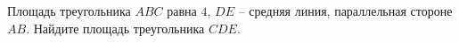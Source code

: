 \begin{ex}
	\begin{condition}
		Площадь треугольника \( ABC \) равна \( 4 \), \( DE\) – средняя линия, параллельная стороне \( AB \). Найдите площадь треугольника \( CDE \).
	\end{condition}
\end{ex}